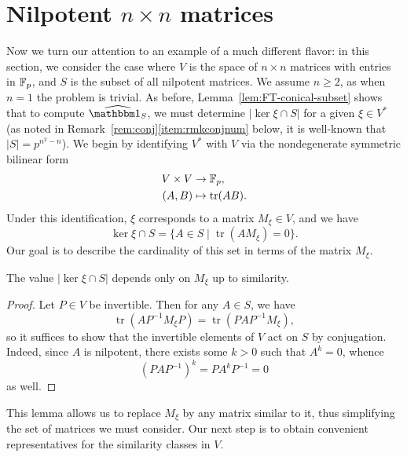 \newcommand{\Mat}{\operatorname{Mat}}
\newcommand{\tr}{\operatorname{tr}}
\newcommand{\fact}{\operatorname{fact}}

\section{Nilpotent $n\times n$ matrices}\label{sec:part3}

Now we turn our attention to an example of a much different flavor: in this section, we consider the case where $V$ is the space of $n\times n$ matrices with entries in $\mathbb{F}_p$, and $S$ is the subset of all nilpotent matrices. We assume $n\ge 2$, as when $n=1$ the problem is trivial. As before, Lemma~\ref{lem:FT-conical-subset} shows that to compute $\widehat{\IND_S}$, we must determine $|\ker\xi\cap S|$ for a given $\xi\in V^*$ (as noted in Remark~\ref{rem:conj}\eqref{item:rmkconjnum} below, it is well-known that $|S|=p^{n^2-n}$). We begin by identifying $V^*$ with $V$ via the nondegenerate symmetric bilinear form
\begin{align*}
V\times V&\to\F_p,\\
(A,B)&\mapsto\tr(AB).
\end{align*}
Under this identification, $\xi$ corresponds to a matrix $M_\xi\in V$, and we have
\begin{equation}
\label{eqn:kerlambda}
\ker\xi\cap S=\{A\in S \mid \tr(AM_\xi)=0\}.
\end{equation}
Our goal is to describe the cardinality of this set in terms of the matrix $M_\xi$.
\begin{lem}
\label{lem:sim}
The value $|\ker\xi\cap S|$ depends only on $M_\xi$ up to similarity.
\end{lem}
\begin{proof}
Let $P\in V$ be invertible. Then for any $A\in S$, we have
\begin{equation*}
\tr(AP^{-1}M_\xi P)=\tr(PAP^{-1}M_\xi),
\end{equation*}
so it suffices to show that the invertible elements of $V$ act on $S$ by conjugation. Indeed, since $A$ is nilpotent, there exists some $k>0$ such that $A^k=0$, whence
\begin{equation*}
(PAP^{-1})^k=PA^kP^{-1}=0
\end{equation*}
as well.
\end{proof}
This lemma allows us to replace $M_\xi$ by any matrix similar to it, thus simplifying the set of matrices we must consider. Our next step is to obtain convenient representatives for the similarity classes in $V$.
